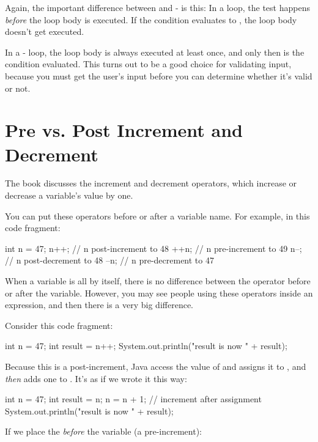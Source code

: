 Again, the important difference between  and - is this: In a  loop, the test happens {\em before} the loop body is executed. If the condition evaluates to , the loop body doesn't get executed.

In a - loop, the loop body is always executed at least once, and only then is the condition evaluated. This turns out to be a good choice for validating input, because you must get the user's input before you can determine whether it's valid or not.

\section{Pre vs. Post Increment and Decrement}


The book discusses the increment \java{++} and decrement \java{--} operators, which increase or decrease a variable's value by one.

You can put these operators before or after a variable name. For example, in this code fragment:

\begin{code}
int n = 47;
n++; // n post-increment to 48
++n; // n pre-increment to 49
n--; // n post-decrement to 48
--n; // n pre-decrement to 47
\end{code}

When a variable is all by itself, there is no difference between the operator before or after the variable. However, you may see people using these operators inside an expression, and then there is a very big difference.

Consider this code fragment:

\begin{code}
int n = 47;
int result = n++;
System.out.println("result is now " + result);
\end{code}

Because this is a post-increment, Java access the value of  and assigns it to , and {\em then} adds one to . It's as if we wrote it this way:

\begin{code}
int n = 47;
int result = n;
n = n + 1; // increment after assignment
System.out.println("result is now " + result);
\end{code}

If we place the \java{++} {\em before} the variable (a pre-increment):

